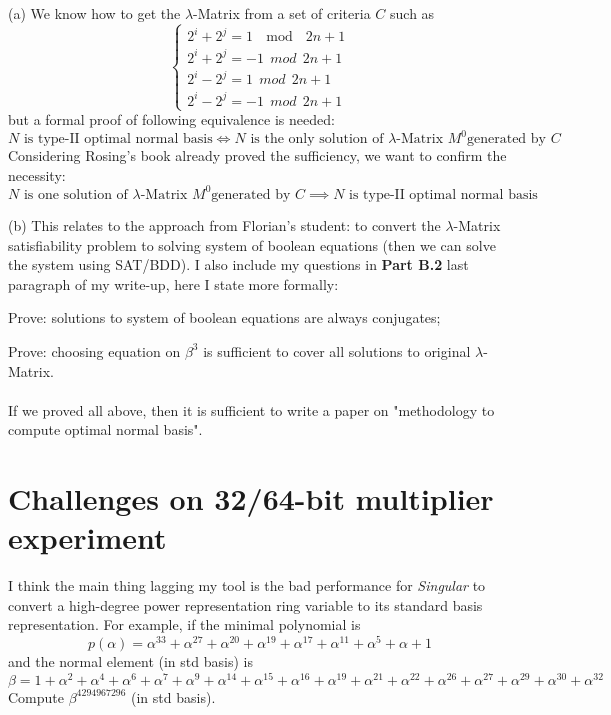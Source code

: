 \documentclass[12pt,letterpaper]{article}
\begin{document}
(a) We know how to get the $\lambda$-Matrix from a set of criteria $C$ such as
\begin{equation}
\begin{cases}
2^i + 2^j = 1 \ \mod\ \  2n+1\\
2^i + 2^j = -1 \ \ mod \ \ 2n+1\\
2^i - 2^j = 1 \ \ mod\ \  2n+1\\
2^i - 2^j = -1 \ \ mod \ \ 2n+1
\end{cases}
\end{equation}
but a formal proof of following equivalence is needed:
$$N\text{ is type-II optimal normal basis} \Leftrightarrow N\text{ is the only solution of }\lambda\text{-Matrix } M^0\text{generated by }C$$
Considering Rosing's book already proved the sufficiency, we want to confirm the necessity:
$$N\text{ is one solution of }\lambda\text{-Matrix } M^0\text{generated by }C \implies N\text{ is type-II optimal normal basis}$$

(b) This relates to the approach from Florian's student: to convert the $\lambda$-Matrix satisfiability problem to solving system
of boolean equations (then we can solve the system using SAT/BDD). I also include my questions in {\bf Part B.2} last paragraph of my write-up,
here I state more formally:

Prove: solutions to system of boolean equations are always conjugates;

Prove: choosing equation on $\beta^3$ is sufficient to cover all solutions to original $\lambda$-Matrix.\\
\vspace{5mm}\\
If we proved all above, then it is sufficient to write a paper on "methodology to compute optimal normal basis".

\section{Challenges on 32/64-bit multiplier experiment}
I think the main thing lagging my tool is the bad performance for \emph{Singular} to convert a high-degree power representation ring variable
to its standard basis representation. For example, if the minimal polynomial is
$$p(\alpha) = \alpha^{33} + \alpha^{27} + \alpha^{20} + \alpha^{19} + \alpha^{17} + \alpha^{11} + \alpha^5 + \alpha + 1$$
and the normal element (in std basis) is 
$$\beta = 1+\alpha^2+\alpha^4+\alpha^6+\alpha^7+\alpha^9+\alpha^{14}+\alpha^{15}+\alpha^{16}+\alpha^{19}+\alpha^{21}+\alpha^{22}+\alpha^{26}+\alpha^{27}+\alpha^{29}+\alpha^{30}+\alpha^{32}$$
Compute $\beta^{4294967296}$ (in std basis).

\end{document}
